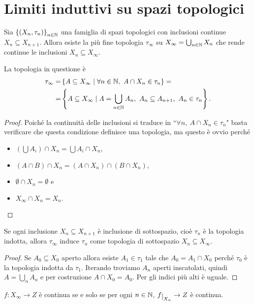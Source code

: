\section{Limiti induttivi su spazi topologici}
\begin{proposition}
Sia $\left\{{(X_n,\tau_n)}\right\}_{n\in\mathbb{N}}$ una famiglia di spazi topologici con inclusioni continue $X_n\subseteq X_{n+1}$. Allora esiste la pi\`u fine topologia $\tau_\infty$ su $X_\infty=\bigcup_{n\in\mathbb{N}}X_n$ che rende continue le inclusioni $X_n\subseteq X_\infty$.

La topologia in questione \`e
\begin{align*}
    \tau_\infty=&\cpa{A\subseteq X_\infty\mid \forall n\in\N,\ A\cap X_n\in\tau_n}=\\
    =&\cpa{A\subseteq X_\infty\mid A=\bigcup_{n\in\N} A_n,\ A_n\subseteq A_{n+1},\ A_n\in \tau_n}.
\end{align*}
\end{proposition}
\begin{proof}
Poich\'e la continuit\`a delle inclusioni si traduce in ``$\forall n,\ A\cap X_n\in \tau_n$" basta verificare che questa condizione definisce una topologia, ma questo \`e ovvio perch\'e 
\begin{itemize}
    \item $(\bigcup A_i)\cap X_n=\bigcup A_i\cap X_n$, 
    \item $(A\cap B)\cap X_n=(A\cap X_n)\cap (B\cap X_n)$, 
    \item $\emptyset\cap X_n=\emptyset$ e 
    \item $X_\infty\cap X_n=X_n$.
\end{itemize}
\end{proof}
\begin{remark}
Se ogni inclusione $X_n\subseteq X_{n+1}$ \`e inclusione di sottospazio, cio\`e $\tau_n$ \`e la topologia indotta, allora $\tau_\infty$ induce $\tau_n$ come topologia di sottospazio $X_n\subseteq X_\infty$.
\end{remark}
\begin{proof}
Se $A_0\subseteq X_0$ aperto allora esiste $A_1\in \tau_1$ tale che $A_0=A_1\cap X_0$ perch\'e $\tau_0$ \`e la topologia indotta da $\tau_1$. Iterando troviamo $A_n$ aperti inscatolati, quindi $A=\bigcup_n A_n$ e per costruzione $A\cap X_0=A_0$. Per gli indici pi\`u alti \`e uguale.
\end{proof}

\begin{remark}
$f:X_\infty\to Z$ \`e continua se e solo se per ogni $n\in\mathbb{N}$, $f\res{X_n}\to Z$ \`e continua.
\end{remark}

